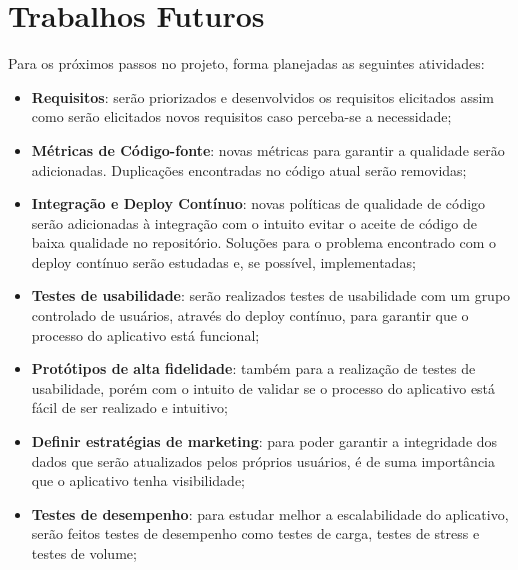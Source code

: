 \section{Trabalhos Futuros}

Para os próximos passos no projeto, forma planejadas as seguintes atividades:

\begin{itemize}
    \item \textbf{Requisitos}: serão priorizados e desenvolvidos os requisitos elicitados assim como serão elicitados novos requisitos caso perceba-se a necessidade;
    \item \textbf{Métricas de Código-fonte}: novas métricas para garantir a qualidade serão adicionadas. Duplicações encontradas no código atual serão removidas;
    \item \textbf{Integração e Deploy Contínuo}: novas políticas de qualidade de código serão adicionadas à integração com o intuito evitar o aceite de código de baixa qualidade no repositório. Soluções para o problema encontrado com o deploy contínuo serão estudadas e, se possível, implementadas;
    \item \textbf{Testes de usabilidade}: serão realizados testes de usabilidade com um grupo controlado de usuários, através do deploy contínuo, para garantir que o processo do aplicativo está funcional;
    \item \textbf{Protótipos de alta fidelidade}: também para a realização de testes de usabilidade, porém com o intuito de validar se o processo do aplicativo está fácil de ser realizado e intuitivo;
    \item \textbf{Definir estratégias de marketing}: para poder garantir a integridade dos dados que serão atualizados pelos próprios usuários, é de suma importância que o aplicativo tenha visibilidade;
    \item \textbf{Testes de desempenho}: para estudar melhor a escalabilidade do aplicativo, serão feitos testes de desempenho como testes de carga, testes de stress e testes de volume;
\end{itemize}
